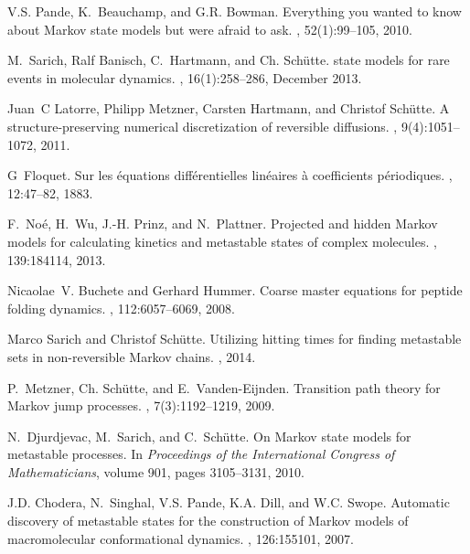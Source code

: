 \documentclass[journal=jctcce,manuscript=article]{achemso}
\begin{document}
\begin{thebibliography}{10}
V.S. Pande, K.~Beauchamp, and G.R. Bowman.
\newblock Everything you wanted to know about {Markov} state models but were
  afraid to ask.
, 52(1):99--105, 2010.

M.~Sarich, Ralf Banisch, C.~Hartmann, and Ch. Sch\"utte.
 state models for rare events in molecular dynamics.
, 16(1):258--286, December 2013.

Juan~C Latorre, Philipp Metzner, Carsten Hartmann, and Christof Sch{\"u}tte.
\newblock A structure-preserving numerical discretization of reversible
  diffusions.
, 9(4):1051--1072, 2011.

G~Floquet.
\newblock Sur les {\'e}quations diff{\'e}rentielles lin{\'e}aires {\`a}
  coefficients p{\'e}riodiques.
,
  12:47--82, 1883.

F.~No\'e, H.~Wu, J.-H. Prinz, and N.~Plattner.
\newblock Projected and hidden {{Markov}} models for calculating kinetics and
  metastable states of complex molecules.
, 139:184114, 2013.

Nicaolae~V. Buchete and Gerhard Hummer.
\newblock Coarse master equations for peptide folding dynamics.
, 112:6057--6069, 2008.

Marco Sarich and Christof Sch{\"u}tte.
\newblock Utilizing hitting times for finding metastable sets in non-reversible
  {Markov} chains.
, 2014.

P.~Metzner, Ch. Sch{\"u}tte, and E.~Vanden-Eijnden.
\newblock Transition path theory for {M}arkov jump processes.
, 7(3):1192--1219, 2009.

N.~Djurdjevac, M.~Sarich, and C.~Sch{\"u}tte.
\newblock On {{Markov}} state models for metastable processes.
\newblock In {\em Proceedings of the International Congress of Mathematicians},
  volume 901, pages 3105--3131, 2010.

J.D. Chodera, N.~Singhal, V.S. Pande, K.A. Dill, and W.C. Swope.
\newblock Automatic discovery of metastable states for the construction of
  {Markov} models of macromolecular conformational dynamics.
, 126:155101, 2007.


\end{thebibliography}
\end{document}
